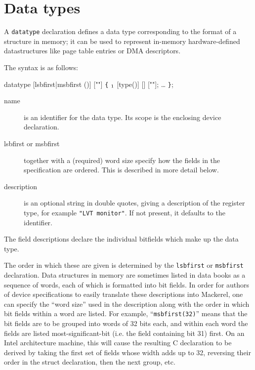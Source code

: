 \documentclass[a4paper,11pt,twoside]{report}
\begin{document}
\section{Data types}\label{sec:datatypes}

A \texttt{datatype} declaration defines a data type corresponding to the
format of a structure in memory; it can be used to represent in-memory
hardware-defined datastructures like page table entries or DMA
descriptors. 

The syntax is as follows:

\begin{syntax}
datatype  [lsbfirst|msbfirst ()] [""] \verb+{+
   \(\sb{1}\)  [type()] [] [""];
   \ldots
\verb+}+;
\end{syntax}

\begin{description}

\item[name] is an identifier for the data type.  Its scope is the
  enclosing device declaration. 

\item[lsbfirst or msbfirst] together with a (required) word size
  specify how the fields in the specification are ordered.  This is
  described in more detail below. 

\item[description] is an optional string in double quotes, giving a
  description of the register type, for example \texttt{"LVT
    monitor"}.   If not present, it defaults to the identifier.  

\end{description}

The field descriptions declare the individual bitfields which make up
the data type.  

The order in which these are given is determined
by the \texttt{lsbfirst} or \texttt{msbfirst} declaration.  Data
structures in memory are sometimes listed in data books as a sequence
of words, each of which is formatted into bit fields.  In order for
authors of device specifications to easily translate these
descriptions into Mackerel, one can specify the ``word size'' used in
the description along with the order in which bit fields within a
word are listed.  For example, ``\texttt{msbfirst(32)}'' means that
the bit fields are to be grouped into words of 32 bits each, and
within each word the fields are listed most-significant-bit (i.e. the
field containing bit 31) first.  On an Intel architecture machine,
this will cause the resulting C declaration to be derived by taking
the first set of fields whose width adds up to 32, reversing their
order in the struct declaration, then the next group, etc. 
\end{document}
